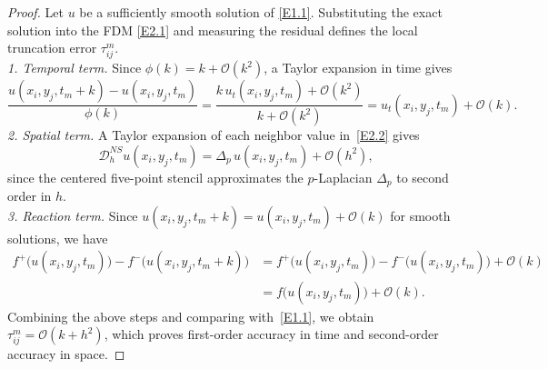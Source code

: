 \documentclass[final,12pt,3p]{elsarticle}
\theoremstyle{plain}
\theoremstyle{definition}
\theoremstyle{remark}
\begin{document}
\begin{proof}
Let $u$ be a sufficiently smooth solution of \eqref{E1.1}.
Substituting the exact solution into the FDM \eqref{E2.1} and measuring the residual defines
the local truncation error $\tau_{ij}^m$.\\
% 
\textit{1. Temporal term.}
Since $\phi(k) = k + \mathcal{O}(k^2)$, a Taylor expansion in time gives
\begin{equation*}
      \frac{u(x_i,y_j,t_m+k) - u(x_i,y_j,t_m)}{\phi(k)}
   = \frac{k\,u_t(x_i,y_j,t_m) + \mathcal{O}(k^2)}{k + \mathcal{O}(k^2)}
   = u_t(x_i,y_j,t_m) + \mathcal{O}(k).
\end{equation*}
% 
\textit{2. Spatial term.}
A Taylor expansion of each neighbor value in~\eqref{E2.2} gives
\begin{equation*}
  \mathcal{D}_h^{NS}  u(x_i,y_j,t_m) = \Delta_p\,  u(x_i,y_j,t_m) + \mathcal{O}(h^2),
\end{equation*}
since the centered five-point stencil approximates the $p$-Laplacian $\Delta_p$ 
to second order in $h$.\\
% 
\textit{3. Reaction term.}
Since %
$u(x_i,y_j,t_m+k) =u(x_i,y_j,t_m)+ \mathcal{O}(k)$ 
for smooth solutions, we have
\begin{equation*}\begin{split}
   f^+\bigl(u(x_i,y_j,t_m)\bigr) - f^-\bigl(u(x_i,y_j,t_m+k)\bigr)
   &= f^+\bigl(u(x_i,y_j,t_m)\bigr) - f^-\bigl(u(x_i,y_j,t_m)\bigr) + \mathcal{O}(k)\\
   &= f\bigl(u(x_i,y_j,t_m)\bigr) + \mathcal{O}(k).
\end{split}\end{equation*}
% 
Combining the above steps and comparing with~\eqref{E1.1}, we obtain
   $\tau_{ij}^m = \mathcal{O}(k + h^2)$,
which proves first-order accuracy in time and second-order accuracy in space.
\end{proof}
\end{document}
